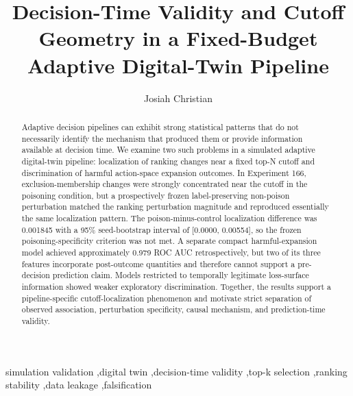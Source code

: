 \documentclass[preprint,12pt]{elsarticle}
\begin{document}
\begin{frontmatter}
\title{Decision-Time Validity and Cutoff Geometry in a Fixed-Budget Adaptive Digital-Twin Pipeline}
\author[aff1]{Josiah Christian}
\begin{abstract}
Adaptive decision pipelines can exhibit strong statistical patterns that do not necessarily identify the mechanism that produced them or provide information available at decision time. We examine two such problems in a simulated adaptive digital-twin pipeline: localization of ranking changes near a fixed top-N cutoff and discrimination of harmful action-space expansion outcomes. In Experiment 166, exclusion-membership changes were strongly concentrated near the cutoff in the poisoning condition, but a prospectively frozen label-preserving non-poison perturbation matched the ranking perturbation magnitude and reproduced essentially the same localization pattern. The poison-minus-control localization difference was 0.001845 with a 95\% seed-bootstrap interval of [0.0000, 0.00554], so the frozen poisoning-specificity criterion was not met. A separate compact harmful-expansion model achieved approximately 0.979 ROC AUC retrospectively, but two of its three features incorporate post-outcome quantities and therefore cannot support a pre-decision prediction claim. Models restricted to temporally legitimate loss-surface information showed weaker exploratory discrimination. Together, the results support a pipeline-specific cutoff-localization phenomenon and motivate strict separation of observed association, perturbation specificity, causal mechanism, and prediction-time validity.
\end{abstract}
\begin{keyword}simulation validation \sep digital twin \sep decision-time validity \sep top-k selection \sep ranking stability \sep data leakage \sep falsification\end{keyword}
\end{frontmatter}
\end{document}
